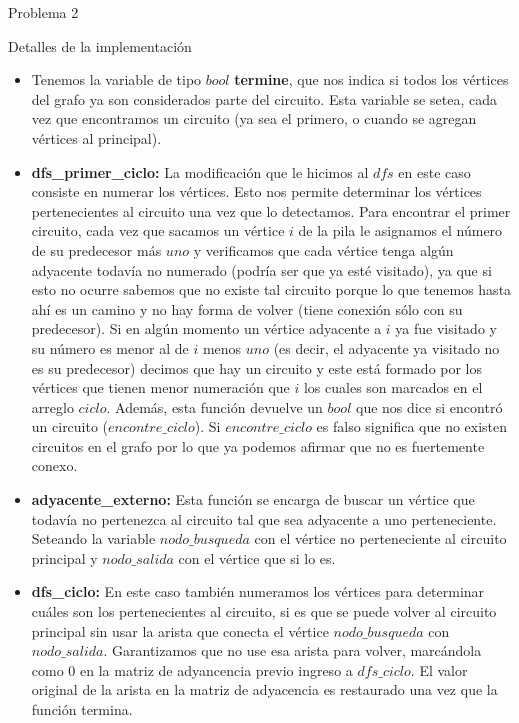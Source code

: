 \begin{section}{Problema 2}
\begin{subsection}{Detalles de la implementación}
		\begin{itemize}
			\item Tenemos la variable de tipo $bool$ \textbf{termine}, que nos indica si todos los vértices del grafo ya son considerados parte del circuito. Esta variable se setea, cada vez que encontramos un circuito (ya sea el primero, o cuando se agregan vértices al principal).

			\item \textbf{dfs\_primer\_ciclo:} La modificación que le hicimos al $dfs$ en este caso consiste en numerar los vértices. Esto nos permite determinar los vértices pertenecientes al circuito una vez que lo detectamos. Para encontrar el primer circuito, cada vez que sacamos un vértice $i$ de la pila le asignamos el número de su predecesor más $uno$ y verificamos que cada vértice tenga algún adyacente todavía no numerado (podría ser que ya esté visitado), ya que si esto no ocurre sabemos que no existe tal circuito porque lo que tenemos hasta ahí es un camino y no hay forma de volver (tiene conexión sólo con su predecesor). Si en algún momento un vértice adyacente a $i$ ya fue visitado y su número es menor al de $i$ menos $uno$ (es decir, el adyacente ya visitado no es su predecesor) decimos que hay un circuito y este está formado por los vértices que tienen menor numeración que $i$ los cuales son marcados en el arreglo $ciclo$. Además, esta función devuelve un $bool$ que nos dice si encontró un circuito ($encontre\_ciclo$). Si $encontre\_ciclo$ es falso significa que no existen circuitos en el grafo por lo que ya podemos afirmar que no es fuertemente conexo.

			\item \textbf{adyacente\_externo:} Esta función se encarga de buscar un vértice que todavía no pertenezca al circuito tal que sea adyacente a uno perteneciente. Seteando la variable $nodo\_busqueda$ con el vértice no perteneciente al circuito principal y $nodo\_salida$ con el vértice que si lo es.
		
			\item \textbf{dfs\_ciclo:} En este caso también numeramos los vértices para determinar cuáles son los pertenecientes al circuito, si es que se puede volver al circuito principal sin usar la arista que conecta el vértice $nodo\_busqueda$ con $nodo\_salida$. Garantizamos que no use esa arista para volver, marcándola como $0$ en la matriz de adyancencia previo ingreso a $dfs\_ciclo$. El valor original de la arista en la matriz de adyacencia es restaurado una vez que la función termina.
			

\end{itemize}
\end{subsection}
\end{section}
